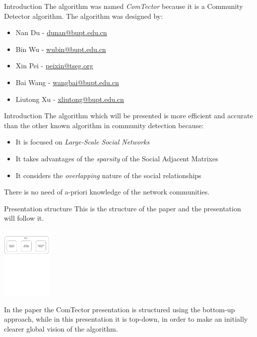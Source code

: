 \begin{frame}{Introduction}
The algorithm was named \emph{ComTector} because it is a Community Detector algorithm. 
\vskip 0.3cm
The algorithm was designed by:

\vskip 0.3cm

\begin{itemize}
  \item Nan Du -  \href{mailto:dunan@bupt.edu.cn}{dunan@bupt.edu.cn}
  \item Bin Wu -  \href{mailto:wubin@bupt.edu.cn}{wubin@bupt.edu.cn}
  \item Xin Pei -  \href{mailto:peixin@tseg.org}{peixin@tseg.org}
  \item Bai Wang -  \href{mailto:wangbai@bupt.edu.cn}{wangbai@bupt.edu.cn}
  \item Liutong Xu -  \href{mailto:xliutong@bupt.edu.cn}{xliutong@bupt.edu.cn}
  
\end{itemize}


\end{frame}

\begin{frame}{Introduction}
The algorithm which will be presented is more efficient and accurate than the other known algorithm in community detection because:

\vskip 0.5cm

\begin{itemize}
  \item It is focused on \emph{Large-Scale Social Networks}
  \item It takes advantages of the \emph{sparsity} of the Social Adjacent Matrixes
  \item It considers the \emph{overlapping} nature of the social relationships
\end{itemize}

\vskip 1cm

There is no need of a-priori knowledge of the network communities.

\end{frame}

\begin{frame}{Presentation structure}
\vskip 0.5cm
This is the structure of the paper and the presentation will follow it.
\vskip 0.5cm

\begin{center}
	\includegraphics[height=3.5cm]{images/paperStructure.pdf}
\end{center}

In the paper the ComTector presentation is structured using the bottom-up approach, while in this presentation it is top-down, in order to make an initially clearer global vision of the algorithm.

\end{frame}